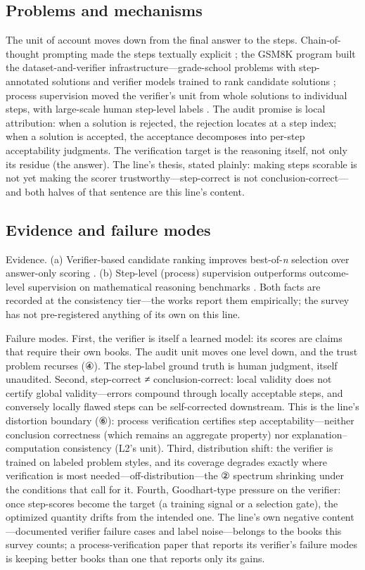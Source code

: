 \documentclass[11pt,a4paper]{article}
\begin{document}
\subsection{Problems and mechanisms}

The unit of account moves down from the final answer to the steps. Chain-of-thought prompting made the steps textually explicit \cite{key01}; the GSM8K program built the dataset-and-verifier infrastructure—grade-school problems with step-annotated solutions and verifier models trained to rank candidate solutions \cite{key05}; process supervision moved the verifier's unit from whole solutions to individual steps, with large-scale human step-level labels \cite{key06}. The audit promise is local attribution: when a solution is rejected, the rejection locates at a step index; when a solution is accepted, the acceptance decomposes into per-step acceptability judgments. The verification target is the reasoning itself, not only its residue (the answer). The line's thesis, stated plainly: making steps scorable is not yet making the scorer trustworthy—step-correct is not conclusion-correct—and both halves of that sentence are this line's content.

\subsection{Evidence and failure modes}

Evidence. (a) Verifier-based candidate ranking improves best-of-\textit{n} selection over answer-only scoring \cite{key05}. (b) Step-level (process) supervision outperforms outcome-level supervision on mathematical reasoning benchmarks \cite{key06}. Both facts are recorded at the consistency tier—the works report them empirically; the survey has not pre-registered anything of its own on this line.

Failure modes. First, the verifier is itself a learned model: its scores are claims that require their own books. The audit unit moves one level down, and the trust problem recurses (④). The step-label ground truth is human judgment, itself unaudited. Second, step-correct ≠ conclusion-correct: local validity does not certify global validity—errors compound through locally acceptable steps, and conversely locally flawed steps can be self-corrected downstream. This is the line's distortion boundary (⑥): process verification certifies step acceptability—neither conclusion correctness (which remains an aggregate property) nor explanation–computation consistency (L2's unit). Third, distribution shift: the verifier is trained on labeled problem styles, and its coverage degrades exactly where verification is most needed—off-distribution—the ② spectrum shrinking under the conditions that call for it. Fourth, Goodhart-type pressure on the verifier: once step-scores become the target (a training signal or a selection gate), the optimized quantity drifts from the intended one. The line's own negative content—documented verifier failure cases and label noise—belongs to the books this survey counts; a process-verification paper that reports its verifier's failure modes is keeping better books than one that reports only its gains.
\end{document}
